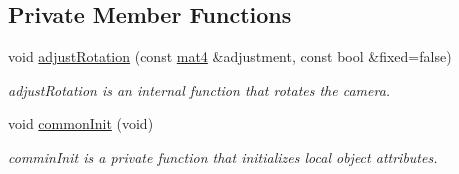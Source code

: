 \subsection*{\-Private \-Member \-Functions}
\begin{DoxyCompactItemize}
\item 
void \hyperlink{class_camera_aba32f195cdb5bfcfd05c2ce74315b6c3}{adjust\-Rotation} (const \hyperlink{class_angel_1_1mat4}{mat4} \&adjustment, const bool \&fixed=false)
\begin{DoxyCompactList}\small\item\em adjust\-Rotation is an internal function that rotates the camera. \end{DoxyCompactList}\item 
void \hyperlink{class_camera_a20243a7e3eb06ab1265118c5fb9cce9b}{common\-Init} (void)
\begin{DoxyCompactList}\small\item\em commin\-Init is a private function that initializes local object attributes. \end{DoxyCompactList}\end{DoxyCompactItemize}
